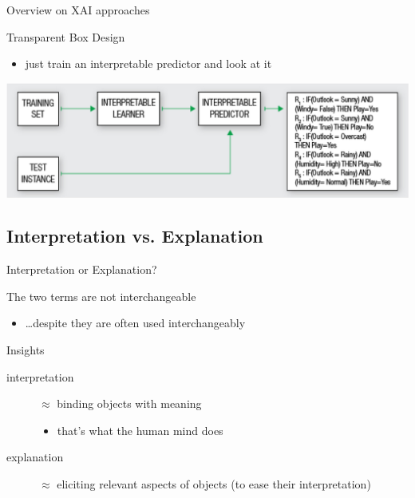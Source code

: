 \documentclass[presentation]{beamer}\mode<presentation>{\usetheme{AMSBolognaFC}}
\begin{document}
\begin{frame}[allowframebreaks]{Overview on XAI approaches}
    \framebreak

    \begin{block}{Transparent Box Design}
        \begin{itemize}
            \item just train an interpretable predictor and look at it
        \end{itemize}
    \end{block}
    \begin{center}
        \includegraphics[width=.8\linewidth]{figures/transparent-box-design.png}
    \end{center}
\end{frame}

\subsection{Interpretation vs. Explanation}

\begin{frame}{Interpretation or Explanation?}

    The two terms are \alert{not} interchangeable
    \begin{itemize}
        \item \ldots despite they are often used interchangeably
    \end{itemize}

    \vfill

    \begin{block}{Insights}
        \begin{description}
            \item[interpretation] $\approx$ binding objects with meaning
            \begin{itemize}
                \item that's what the human mind does
            \end{itemize}

            \item[explanation] $\approx$ eliciting relevant aspects of objects (to ease their interpretation)
        \end{description}
    \end{block}
\end{frame}
\end{document}

